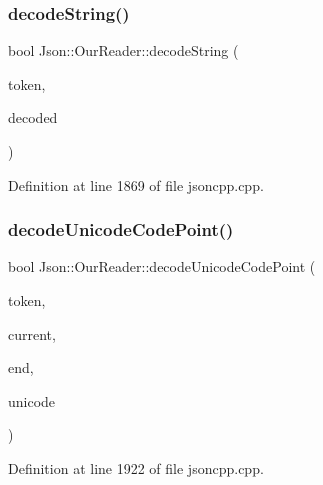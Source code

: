 \subsubsection{\texorpdfstring{decode\+String()}{decodeString()}\hspace{0.1cm}{\footnotesize\ttfamily [2/2]}}
{\footnotesize\ttfamily bool Json\+::\+Our\+Reader\+::decode\+String (\begin{DoxyParamCaption}\item[{\hyperlink{class_json_1_1_our_reader_1_1_token}{Token} \&}]{token,  }\item[{\hyperlink{config_8h_a1e723f95759de062585bc4a8fd3fa4be}{J\+S\+O\+N\+C\+P\+P\+\_\+\+S\+T\+R\+I\+NG} \&}]{decoded }\end{DoxyParamCaption})\hspace{0.3cm}{\ttfamily [private]}}



Definition at line 1869 of file jsoncpp.\+cpp.

\hypertarget{class_json_1_1_our_reader_ac1bf03c161ece082e48da450c50f528d}{}\label{class_json_1_1_our_reader_ac1bf03c161ece082e48da450c50f528d} 
\subsubsection{\texorpdfstring{decode\+Unicode\+Code\+Point()}{decodeUnicodeCodePoint()}}
{\footnotesize\ttfamily bool Json\+::\+Our\+Reader\+::decode\+Unicode\+Code\+Point (\begin{DoxyParamCaption}\item[{\hyperlink{class_json_1_1_our_reader_1_1_token}{Token} \&}]{token,  }\item[{\hyperlink{class_json_1_1_our_reader_a1bdc7bbc52ba87cae6b19746f2ee0189}{Location} \&}]{current,  }\item[{\hyperlink{class_json_1_1_our_reader_a1bdc7bbc52ba87cae6b19746f2ee0189}{Location}}]{end,  }\item[{unsigned int \&}]{unicode }\end{DoxyParamCaption})\hspace{0.3cm}{\ttfamily [private]}}



Definition at line 1922 of file jsoncpp.\+cpp.

\hypertarget{class_json_1_1_our_reader_adb39be814cc6076b91a0919bdd5b24b0}{}\label{class_json_1_1_our_reader_adb39be814cc6076b91a0919bdd5b24b0} 
